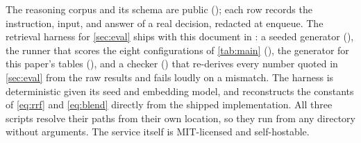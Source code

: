 \documentclass[10pt,twocolumn]{article}
\begin{document}
The reasoning corpus and its schema are public
()\citep{ctecx2026hypermem}; each row records
the instruction, input, and answer of a real decision, redacted at enqueue. The
retrieval harness for \cref{sec:eval} ships with this document in : a
seeded generator (), the runner that scores the eight
configurations of \cref{tab:main} (), the generator for
this paper's tables (), and a checker ()
that re-derives every number quoted in \cref{sec:eval} from the raw results and
fails loudly on a mismatch. The harness is deterministic given its seed and
embedding model, and reconstructs the constants of \cref{eq:rrf} and
\cref{eq:blend} directly from the shipped implementation. All three scripts
resolve their paths from their own location, so they run from any directory
without arguments. The service itself is MIT-licensed and self-hostable.



\end{document}
